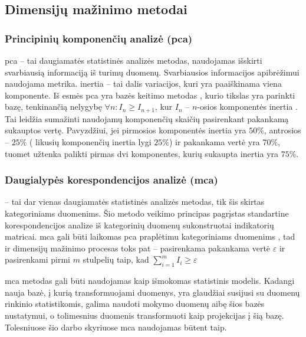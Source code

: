 \subsection{Dimensijų mažinimo metodai}

\subsubsection{Principinių komponenčių analizė (\gls{pca})}

\gls{pca} -- tai daugiamatės statistinės analizės metodas, naudojamas išskirti svarbiausią informaciją iš turimų duomenų. Svarbiausios informacijos apibrėžimui naudojama  metrika. \Gls{inertia} -- tai dalis variacijos, kuri yra paaiškinama viena komponente. Iš esmės \gls{pca} yra bazės keitimo metodas , kurio tikslas yra parinkti bazę, tenkinančią nelygybę $\forall n: I_n \ge I_{n+1}$, kur $I_n$ -- $n$-osios komponentės \gls{inertia} \cite{abdiPrincipalComponentAnalysis2010}. Tai leidžia sumažinti naudojamų komponenčių skaičių pasirenkant pakankamą sukauptos  vertę. Pavyzdžiui, jei pirmosios komponentės \gls{inertia} yra $50\%$, antrosios -- $25\%$ (\rightarrow \; likusių komponenčių \gls{inertia} lygi $25\%$) ir pakankama  vertė yra $70\%$, tuomet užtenka palikti pirmas dvi komponentes, kurių sukaupta \gls{inertia}  yra $75\%$.

\subsubsection{Daugialypės korespondencijos analizė (\gls{mca})}\label{sec:literature:mca}

 -- tai dar vienas daugiamatės statistinės analizės metodas, tik šis skirtas kategoriniams duomenims. Šio metodo veikimo principas pagrįstas standartine korespondencijos analize  iš kategorinių duomenų sukonstruotai indikatorių matricai. \gls{mca} gali būti laikomas \gls{pca} praplėtimu kategoriniams duomenims \cite{abdiMultipleCorrespondenceAnalysis2007}, tad ir dimensijų mažinimo procesas toks pat -- pasirenkama pakankama  vertė $\varepsilon$ ir pasirenkami pirmi $m$ stulpelių taip, kad $\sum_{i=1}^m{I_i} \ge \varepsilon$

\gls{mca} metodas gali būti naudojamas kaip išmokomas statistinis modelis. Kadangi nauja bazė, į kurią transformuojami duomenys, yra glaudžiai susijusi su duomenų rinkinio statistikomis, galima naudoti mokymo duomenų aibę šios bazės nustatymui, o tolimesnius duomenis transformuoti kaip projekcijas į šią bazę. Tolesniuose šio darbo skyriuose \gls{mca} naudojamas būtent taip.